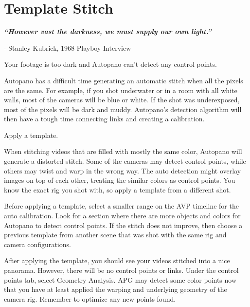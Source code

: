 \section{Template Stitch}
\pagecolor{white}
\label{chap:40}
\begin{fullwidth}

{\itshape\bfseries “However vast the darkness, we must supply our own light.”}

- Stanley Kubrick, 1968 Playboy Interview
\vspace{\baselineskip}

\problem

{\large Your footage is too dark and Autopano can’t detect any control points. \par}

Autopano has a difficult time generating an automatic stitch when all the pixels are the same. For example, if you shot underwater or in a room with all white walls, most of the cameras will be blue or white. If the shot was underexposed, most of the pixels will be dark and muddy. Autopano’s detection algorithm will then have a tough time connecting links and creating a calibration.

\solutions

{\large Apply a template. \par}

When stitching videos that are filled with mostly the same color, Autopano will generate a distorted stitch. Some of the cameras may detect control points, while others may twist and warp in the wrong way. The auto detection might overlay images on top of each other, treating the similar colors as control points. You know the exact rig you shot with, so apply a template from a different shot.


Before applying a template, select a smaller range on the AVP timeline for the auto calibration. Look for a section where there are more objects and colors for Autopano to detect control points. If the stitch does not improve, then choose a previous template from another scene that was shot with the same rig and camera configurations. 


After applying the template, you should see your videos stitched into a nice panorama. However, there will be no control points or links. Under the control points tab, select Geometry Analysis. APG may detect some color points now that you have at least applied the warping and underlying geometry of the camera rig. Remember to optimize any new points found.


\end{fullwidth}
